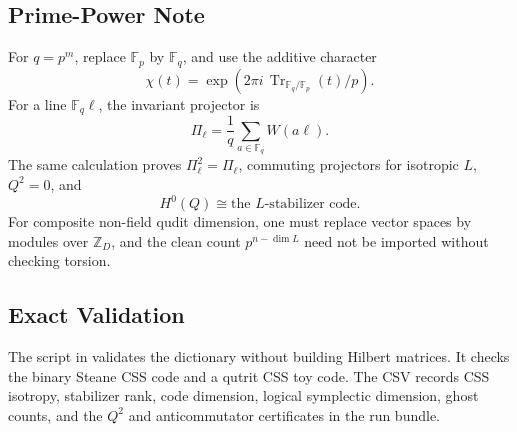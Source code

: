 \subsection{Prime-Power Note}

For \(q=p^m\), replace \(\mathbb F_p\) by \(\mathbb F_q\), and use the additive
character
\[
  \chi(t)=\exp(2\pi i\,\operatorname{Tr}_{\mathbb F_q/\mathbb F_p}(t)/p).
\]
For a line \(\mathbb F_q\ell\), the invariant projector is
\[
  \Pi_\ell=\frac1q\sum_{a\in\mathbb F_q}W(a\ell).
\]
The same calculation proves \(\Pi_\ell^2=\Pi_\ell\), commuting projectors for
isotropic \(L\), \(Q^2=0\), and
\[
  H^0(Q)\cong\text{the }L\text{-stabilizer code}.
\]
For composite non-field qudit dimension, one must replace vector spaces by
modules over \(\mathbb Z_D\), and the clean count \(p^{n-\dim L}\) need not be
imported without checking torsion.

\subsection{Exact Validation}

The script  in
 validates the dictionary without building Hilbert
matrices. It checks the binary Steane CSS code and a qutrit CSS toy code. The
CSV  records CSS isotropy,
stabilizer rank, code dimension, logical symplectic dimension, ghost counts,
and the \(Q^2\) and anticommutator certificates in the
 run bundle.
